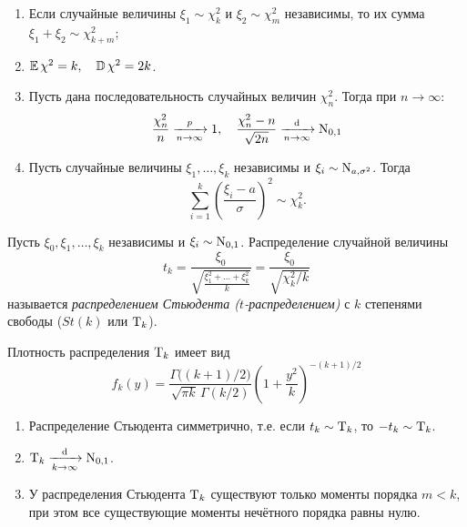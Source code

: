 \begin{namedthm}\leavevmode
\begin{enumerate}
    \item Если случайные величины $\xi_1 \sim \chi^{2}_{k}$ и $\xi_2 \sim \chi^{2}_{m}$ независимы, то их сумма $\xi_1+\xi_2 \sim \chi^{2}_{k+m}$;
    \item $\operatorname{\mathbb{E}} \chi^{2}=k, \quad \operatorname{\mathbb{D}} \chi^{2}=2 k$.
    \item Пусть дана последовательность случайных величин $\chi_{n}^{2}$. Тогда при $n \to \infty$:
    \begin{equation*}
        \frac{\chi_{n}^{2}}{n} \xrightarrow[n \to \infty]{p} 1, 
        \quad \frac{\chi_{n}^{2}-n}{\sqrt{2 n}} \xrightarrow[n \to \infty]{\text{d}} \operatorname{\mathrm{N}}_{0,1}
    \end{equation*}
    \item Пусть случайные величины $\xi_1, \ldots, \xi_k$ независимы и $\xi_i \sim \operatorname{\mathrm{N}}_{a,\sigma^{2}}$. Тогда
    \begin{equation*}
        \sum\limits_{i=1}^{k}\left(\frac{\xi_{i}-a}{\sigma}\right)^{2} \sim \chi^{2}_{k}.
    \end{equation*}
\end{enumerate}
\end{namedthm}

\begin{defn}
    Пусть $\xi_{0}, \xi_{1}, \ldots, \xi_{k}$ независимы и $\xi_i \sim \operatorname{\mathrm{N}}_{0,1}$. Распределение случайной величины
    \begin{equation*}
        t_{k}
        = \frac{\xi_{0}}{\sqrt{\frac{\xi_{1}^{2} + \ldots + \xi_{k}^{2}}{k}}} 
        = \frac{\xi_0}{\sqrt{\chi_{k}^{2} / k}}
    \end{equation*}
    называется \textit{распределением Стьюдента ($t$-распределением)} с $k$ степенями свободы ($St(k)$ или $\operatorname{\mathrm{T}}_{k}$).
\end{defn}
Плотность распределения $\operatorname{\mathrm{T}}_{k}$ имеет вид
\begin{equation*}
    f_{k}(y)=\frac{\Gamma\bigl((k+1) / 2\bigr)}{\sqrt{\pi k} \, \Gamma(k / 2)}\left(1+\frac{y^{2}}{k}\right)^{-(k+1) / 2}
\end{equation*}

\begin{namedthm}\leavevmode
\begin{enumerate}
    \item Распределение Стьюдента симметрично, т.е. если $t_k \sim \operatorname{\mathrm{T}}_{k}$, то $-t_k \sim \operatorname{\mathrm{T}}_{k}$.
    \item $\operatorname{\mathrm{T}}_{k} \xrightarrow[k \to \infty]{\text{d}} \operatorname{\mathrm{N}}_{0,1}$.
    \item У распределения Стьюдента $\operatorname{\mathrm{T}}_{k}$ существуют только моменты порядка $m < k$, при этом все существующие моменты нечётного порядка равны нулю.
\end{enumerate}
\end{namedthm}

